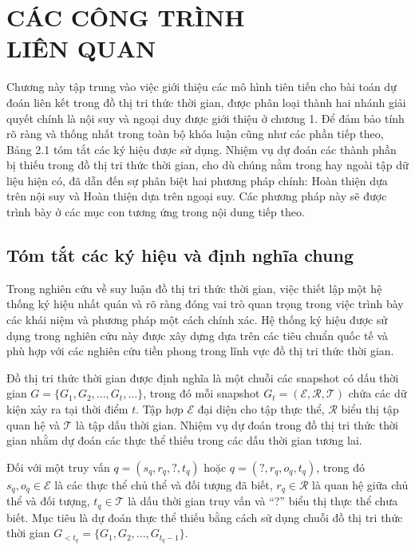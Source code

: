 \chapter{CÁC CÔNG TRÌNH \\ LIÊN QUAN}
\label{Chapter2}

Chương này tập trung vào việc giới thiệu các mô hình tiên tiến cho bài toán dự đoán liên kết trong đồ thị tri thức thời gian, được phân loại thành hai nhánh giải quyết chính là nội suy và ngoại duy được giới thiệu ở chương 1. Để đảm bảo tính rõ ràng và thống nhất trong toàn bộ khóa luận cũng như các phần tiếp theo, Bảng 2.1 tóm tắt các ký hiệu được sử dụng. Nhiệm vụ dự đoán các thành phần bị thiếu trong đồ thị tri thức thời gian, cho dù chúng nằm trong hay ngoài tập dữ liệu hiện có, đã dẫn đến sự phân biệt hai phương pháp chính: Hoàn thiện dựa trên nội suy và
Hoàn thiện dựa trên ngoại suy. Các phương pháp này sẽ được trình bày ở các mục con tương ứng trong nội dung tiếp theo.


\section{Tóm tắt các ký hiệu và định nghĩa chung}

Trong nghiên cứu về suy luận đồ thị tri thức thời gian, việc thiết lập một hệ thống ký hiệu nhất quán và rõ ràng đóng vai trò quan trọng trong việc trình bày các khái niệm và phương pháp một cách chính xác. Hệ thống ký hiệu được sử dụng trong nghiên cứu này được xây dựng dựa trên các tiêu chuẩn quốc tế và phù hợp với các nghiên cứu tiền phong trong lĩnh vực đồ thị tri thức thời gian.

Đồ thị tri thức thời gian được định nghĩa là một chuỗi các snapshot có dấu thời gian \( G = \{G_1, G_2, ..., G_t, ...\} \), trong đó mỗi snapshot \( G_t = (\mathcal{E}, \mathcal{R}, \mathcal{T}) \) chứa các dữ kiện xảy ra tại thời điểm \( t \). Tập hợp \( \mathcal{E} \) đại diện cho tập thực thể, \( \mathcal{R} \) biểu thị tập quan hệ và \( \mathcal{T} \) là tập dấu thời gian. Nhiệm vụ dự đoán trong đồ thị tri thức thời gian nhằm dự đoán các thực thể thiếu trong các dấu thời gian tương lai.

Đối với một truy vấn \( q = (s_q, r_q, ?, t_q) \) hoặc \( q = (?, r_q, o_q, t_q) \), trong đó \( s_q, o_q \in \mathcal{E} \) là các thực thể chủ thể và đối tượng đã biết, \( r_q \in \mathcal{R} \) là quan hệ giữa chủ thể và đối tượng, \( t_q \in \mathcal{T} \) là dấu thời gian truy vấn và ``?'' biểu thị thực thể chưa biết. Mục tiêu là dự đoán thực thể thiếu bằng cách sử dụng chuỗi đồ thị tri thức thời gian \( G_{<t_q} = \{G_1, G_2, ..., G_{t_q-1}\} \).

